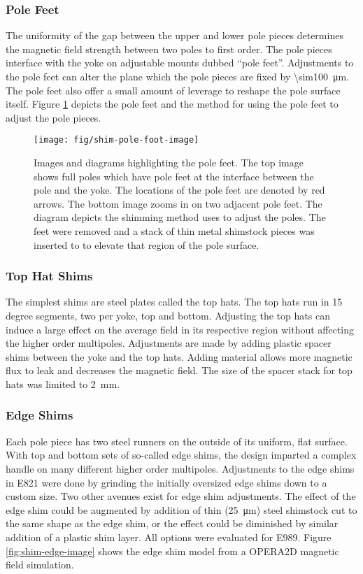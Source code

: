 \subsubsection{Pole Feet}
The uniformity of the gap between the upper and lower pole pieces determines the magnetic field strength between two poles to first order. The pole pieces interface with the yoke on adjustable mounts dubbed ``pole feet''.  Adjustments to the pole feet can alter the plane which the pole pieces are fixed by \SI{\sim100}{\micro \meter}.  The pole feet also offer a small amount of leverage to reshape the pole surface itself.  Figure \ref{fig:shim-pole-foot-image} depicts the pole feet and the method for using the pole feet to adjust the pole pieces.

\begin{figure}
\centering
\texttt{[image: fig/shim-pole-foot-image]}
\caption{
    Images and diagrams highlighting the pole feet.  The top image shows full poles which have pole feet at the interface between the pole and the yoke.  The locations of the pole feet are denoted by red arrows. The bottom image zooms in on two adjacent pole feet.  The diagram depicts the shimming method uses to adjust the poles.  The feet were removed and a stack of thin metal shimstock pieces was inserted to to elevate that region of the pole surface. 
    \label{fig:shim-pole-foot-image}
}
\end{figure}


\subsubsection{Top Hat Shims}
The simplest shims are steel plates called the top hats.  The top hats run in 15 degree segments, two per yoke, top and bottom.  Adjusting the top hats can induce a large effect on the average field in its respective region without affecting the higher order multipoles.  Adjustments are made by adding plastic spacer shims between the yoke and the top hats.  Adding material allows more magnetic flux to leak and decreases the magnetic field.  The size of the spacer stack for top hats was limited to \SI{2}{\mm}.

\subsubsection{Edge Shims}
Each pole piece has two steel runners on the outside of its uniform, flat surface.  With top and bottom sets of so-called edge shims, the design imparted a complex handle on many different higher order multipoles.  Adjustments to the edge shims in E821 were done by grinding the initially oversized edge shims down to a custom size.  Two other avenues exist for edge shim adjustments. The effect of the edge shim could be augmented by addition of thin (\SI{25}{\micro \meter}) steel shimstock cut to the same shape as the edge shim, or the effect could be diminished by similar addition of a plastic shim layer.  All options were evaluated for E989.  Figure \ref{fig:shim-edge-image} shows the edge shim model from a OPERA2D magnetic field simulation.  

